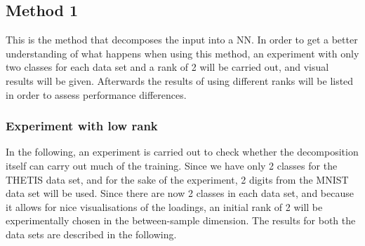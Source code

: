 \subsection{Method 1}
This is the method that decomposes the input into a NN. In order to get a better understanding of what happens when using this method, an experiment with only two classes for each data set and a rank of 2 will be carried out, and visual results will be given. Afterwards the results of using different ranks will be listed in order to assess performance differences.

\subsubsection{Experiment with low rank} \label{tex:result_experiment}
In the following, an experiment is carried out to check whether the decomposition itself can carry out much of the training. Since we have only 2 classes for the THETIS data set, and for the sake of the experiment, 2 digits from the MNIST data set will be used. Since there are now 2 classes in each data set, and because it allows for nice visualisations of the loadings, an initial rank of 2 will be experimentally chosen in the between-sample dimension. The results for both the data sets are described in the following.

